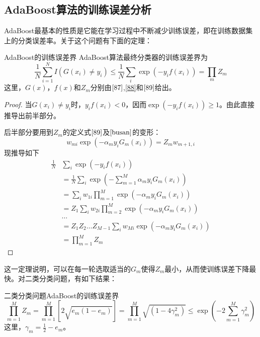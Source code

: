 \subsection*{AdaBoost算法的训练误差分析}
AdaBoost最基本的性质是它能在学习过程中不断减少训练误差，即在训练数据集上的分类误差率。关于这个问题有下面的定理：
\begin{theorem}{AdaBoost的训练误差界}{}
	AdaBoost算法最终分类器的训练误差界为
	\begin{equation}
		\frac{1}{N}\sum_{i=1}^{N}I(G(x_i)\ne y_i)\leqslant \frac{1}{N}\sum_i\exp (-y_if(x_i))=\prod_mZ_m
	\end{equation}
	这里，$G(x)$，$f(x)$和$Z_m$分别由$\ref{87}$,\ref{88}和$\ref{89}$给出。
\end{theorem}
\begin{proof}
	
	当$G(x_i)\ne y_i$时，$y_if(x_i)<0$，因而$\exp(-y_if(x_i))\geqslant 1$。由此直接推导出前半部分。
	
	后半部分要用到$Z_m$的定义式$\ref{89}$及$\ref{busan}$的变形：
	\begin{equation}
		w_{mi}\exp(-\alpha_m y_iG_m(x_i))=Z_mw_{m+1,i}
	\end{equation}
	现推导如下
	\begin{equation}
		\begin{aligned}
			\frac{1}{N}&\sum_i\exp(-y_if(x_i))\\
			&=\frac{1}{N}\sum_i\exp\left(-\sum_{m=1}^{M}\alpha_my_iG_m(x_i)\right)\\
			&=\sum_iw_{1i}\prod_{m=1}^{M}\exp(-\alpha_my_iG_m(x_i))\\
			&=Z_1\sum_iw_{2i}\prod_{m=2}^{M}\exp(-\alpha_my_iG_m(x_i))\\
			&\dots\\
			&=Z_1Z_2\dots Z_{M-1}\sum_iw_{Mi}\exp(-\alpha_my_iG_m(x_i))\\
			&=\prod_{m=1}^{M}Z_m
		\end{aligned}
	\end{equation}
\end{proof}
这一定理说明，可以在每一轮选取适当的$G_m$使得$Z_m$最小，从而使训练误差下降最快。对二类分类问题，有如下结果：
\begin{theorem}{二类分类问题AdaBoost的训练误差界}{}
	\begin{equation}
		\prod_{m=1}^{M}Z_m=\prod_{m=1}^{M}[2\sqrt{e_m(1-e_m)}]=\prod_{m=1}^{M}\sqrt{(1-4\gamma_m^2)}\leqslant \exp\left(-2\sum_{m=1}^{M}\gamma_m^2 \right)
	\end{equation}
	这里，$\gamma_m=\frac{1}{2}-e_m$。
\end{theorem}

